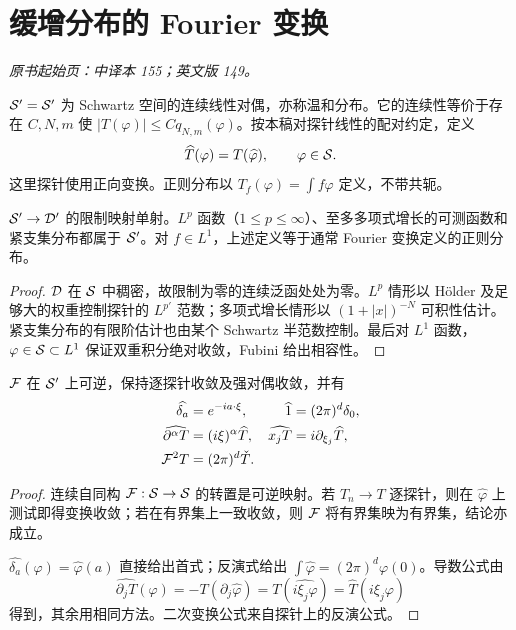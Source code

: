 \section{缓增分布的 Fourier 变换}\label{sec:yosida-06-02}
\noindent\textit{原书起始页：中译本 155；英文版 149。}

\begin{definition}[缓增分布与对偶变换]
$\mathcal{S}'=\mathcal{S}'$ 为 Schwartz 空间的连续线性对偶，亦称温和分布。它的连续性等价于存在 $C,N,m$ 使
$|T(\varphi)|\le Cq_{N,m}(\varphi)$。按本稿对探针线性的配对约定，定义
\[
 \widehat T(\varphi)=T(\widehat\varphi),\qquad\varphi\in\mathcal{S}.
\]
这里探针使用正向变换。正则分布以 $T_f(\varphi)=\int f\varphi$ 定义，不带共轭。
\end{definition}

\begin{proposition}[与普通分布及函数变换相容]
$\mathcal{S}'\to\mathcal{D}'$ 的限制映射单射。$L^p$ 函数（$1\le p\le\infty$）、至多多项式增长的可测函数和紧支集分布都属于 $\mathcal{S}'$。对 $f\in L^1$，上述定义等于通常 Fourier 变换定义的正则分布。
\end{proposition}
\begin{proof}
$\mathcal{D}$ 在 $\mathcal{S}$ 中稠密，故限制为零的连续泛函处处为零。$L^p$ 情形以 H\"older 及足够大的权重控制探针的 $L^{p'}$ 范数；多项式增长情形以 $(1+|x|)^{-N}$ 可积性估计。紧支集分布的有限阶估计也由某个 Schwartz 半范数控制。最后对 $L^1$ 函数，$\varphi\in\mathcal{S}\subset L^1$ 保证双重积分绝对收敛，Fubini 给出相容性。
\end{proof}

\begin{theorem}[变换的基本规则]\label{thm:y6-tempered-rules}
$\mathcal{F}$ 在 $\mathcal{S}'$ 上可逆，保持逐探针收敛及强对偶收敛，并有
\begin{align*}
 \widehat{\delta_a}&=e^{-ia\cdot\xi},&\widehat1&=(2\pi)^d\delta_0,\\
 \widehat{\partial^\alpha T}&=(i\xi)^\alpha\widehat T,&
 \widehat{x_jT}&=i\partial_{\xi_j}\widehat T,\\
 \mathcal{F}^2T&=(2\pi)^d\check{T}.&
\end{align*}
\end{theorem}
\begin{proof}
连续自同构 $\mathcal{F}:\mathcal{S}\to\mathcal{S}$ 的转置是可逆映射。若 $T_n\to T$ 逐探针，则在 $\widehat\varphi$ 上测试即得变换收敛；若在有界集上一致收敛，则 $\mathcal{F}$ 将有界集映为有界集，结论亦成立。

$\widehat{\delta_a}(\varphi)=\widehat\varphi(a)$ 直接给出首式；反演式给出 $\int\widehat\varphi=(2\pi)^d\varphi(0)$。导数公式由
\[
 \widehat{\partial_jT}(\varphi)=-T(\partial_j\widehat\varphi)
 =T(\widehat{i\xi_j\varphi})=\widehat T(i\xi_j\varphi)
\]
得到，其余用相同方法。二次变换公式来自探针上的反演公式。
\end{proof}

